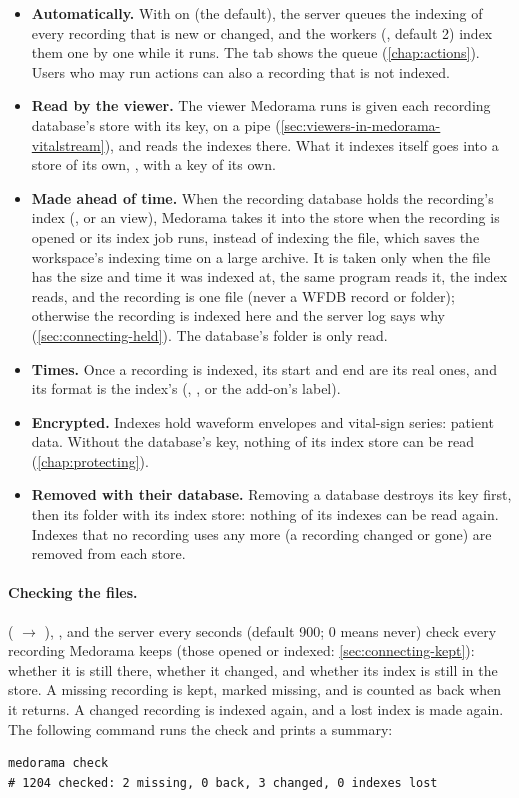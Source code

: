 \begin{itemize}
\item \textbf{Automatically.} With  on (the default), the server queues the
  indexing of every recording that is new or changed, and the workers (, default 2)
  index them one by one while it runs. The  tab shows the queue (\cref{chap:actions}).
  Users who may run actions can also  a recording that is not indexed.
\item \textbf{Read by the viewer.} The viewer Medorama runs is given each recording database's
  store with its key, on a pipe (\cref{sec:viewers-in-medorama-vitalstream}), and reads the indexes there. What
  it indexes itself goes into a store of its own, , with a
  key of its own.
\item \textbf{Made ahead of time.} When the recording database holds the recording's index
  (, or an  view), Medorama takes it into the store when
  the recording is opened or its index job runs, instead of indexing the file, which saves the
  workspace's indexing time on a large archive. It is taken only when the file has the size and
  time it was indexed at, the same program reads it, the index reads, and the recording is one
  file (never a WFDB record or folder); otherwise the recording is indexed here and the server log
  says why (\cref{sec:connecting-held}). The database's folder is only read.
\item \textbf{Times.} Once a recording is indexed, its start and end are its real ones, and its
  format is the index's (, , or the add-on's label).
\item \textbf{Encrypted.} Indexes hold waveform envelopes and vital-sign series: patient data.
  Without the database's key, nothing of its index store can be read (\cref{chap:protecting}).
\item \textbf{Removed with their database.} Removing a database destroys its key first, then its
  folder with its index store: nothing of its indexes can be read again. Indexes that no
  recording uses any more (a recording changed or gone) are removed from each store.
\end{itemize}

\paragraph{Checking the files.}  ( $\rightarrow$
), , and the server every  seconds
(default 900; 0 means never) check every recording Medorama keeps (those opened or indexed:
\cref{sec:connecting-kept}): whether it is
still there, whether it changed, and whether its index is still in the store. A missing recording
is kept, marked missing, and is counted as back when it returns. A changed recording is indexed
again, and a lost index is made again. The following command runs the check and prints a summary:
\begin{lstlisting}[style=shell]
medorama check
# 1204 checked: 2 missing, 0 back, 3 changed, 0 indexes lost
\end{lstlisting}

